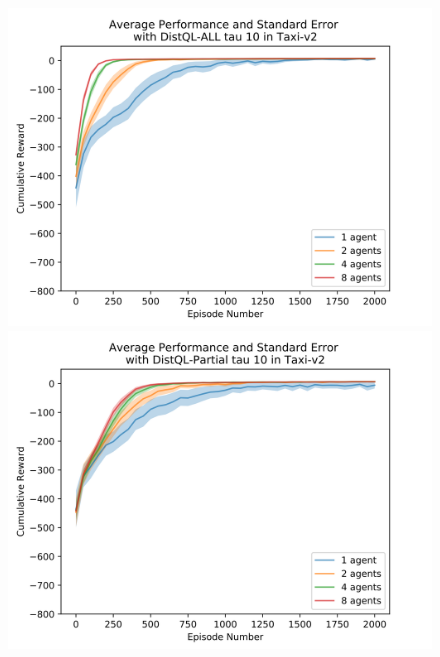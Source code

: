 \documentclass[jair,twoside,11pt,theapa]{article}
\begin{document}
\begin{figure}[h]
\centering
\begin{minipage}{.5\textwidth}
	\centering
	\includegraphics[width=1\linewidth]{resultImages/binned-Average-Performance-and-Standard-Error-with-DistQL-ALL-tau-10-in-Taxi-v2}
	\caption{}
	\label{fig:DistQL-ALL-tau-10-env-Taxi}
\end{minipage}%
\begin{minipage}{.5\textwidth}
	\centering
	\includegraphics[width=1\linewidth]{resultImages/binned-Average-Performance-and-Standard-Error-with-DistQL-Partial-tau-10-in-Taxi-v2}
	\caption{}
	\label{fig:DistQL-Partial-tau-10-env-Taxi}
\end{minipage}
\end{figure}
\end{document}
